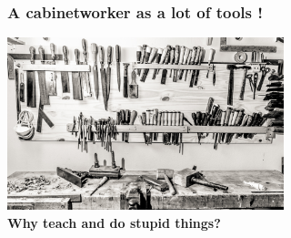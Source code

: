\begin{frame}
  \frametitle{A cabinetworker as a lot of tools !}
  \begin{center}
    \includegraphics[height=5cm]{images/ebeniste.jpg} \\[1em]
    \textbf{Why teach and do stupid things?}
  \end{center}
\end{frame}

